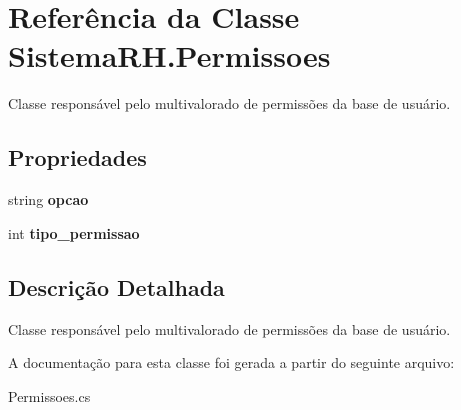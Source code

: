 \hypertarget{class_sistema_r_h_1_1_permissoes}{
\section{Referência da Classe SistemaRH.Permissoes}
\label{class_sistema_r_h_1_1_permissoes}
}


Classe responsável pelo multivalorado de permissões da base de usuário.  


\subsection*{Propriedades}
\begin{DoxyCompactItemize}
\item 
\hypertarget{class_sistema_r_h_1_1_permissoes_a9dd4194f521ed4816792128132ff4b5b}{
string {\bfseries opcao}}
\label{class_sistema_r_h_1_1_permissoes_a9dd4194f521ed4816792128132ff4b5b}

\item 
\hypertarget{class_sistema_r_h_1_1_permissoes_a4a97d2ba415be6e86c1a20108d049d74}{
int {\bfseries tipo\_\-permissao}}
\label{class_sistema_r_h_1_1_permissoes_a4a97d2ba415be6e86c1a20108d049d74}

\end{DoxyCompactItemize}


\subsection{Descrição Detalhada}
Classe responsável pelo multivalorado de permissões da base de usuário. 

A documentação para esta classe foi gerada a partir do seguinte arquivo:\begin{DoxyCompactItemize}
\item 
Permissoes.cs\end{DoxyCompactItemize}
